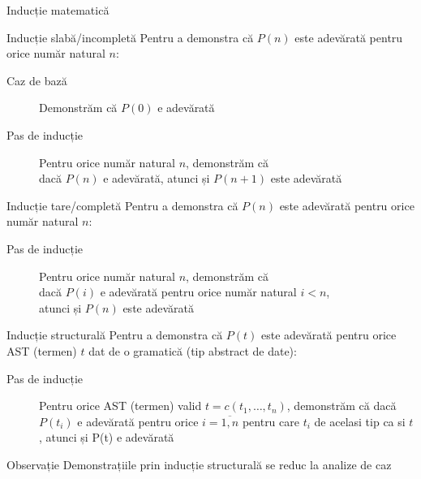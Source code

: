 \begin{section}{Inducție matematică}
\begin{frame}{Inducție slabă/incompletă}
Pentru a demonstra că $P(n)$ este adevărată pentru orice număr natural $n$:
\begin{description}
\item[Caz de bază] Demonstrăm că $P(0)$ e adevărată
\item[Pas de inducție] Pentru orice număr natural $n$, demonstrăm că \\dacă $P(n)$ e adevărată, atunci și $P(n+1)$ este adevărată 
\end{description}
\end{frame}

\begin{frame}{Inducție tare/completă}
Pentru a demonstra că $P(n)$ este adevărată pentru orice număr natural $n$:
\begin{description}
\item[Pas de inducție] Pentru orice număr natural $n$, demonstrăm că \\dacă $P(i)$ e adevărată pentru orice număr natural $i < n$, \\atunci și $P(n)$ este adevărată 
\end{description}
\end{frame}


\begin{frame}{Inducție structurală}
Pentru a demonstra că $P(t)$ este adevărată pentru orice AST (termen) $t$ dat de o gramatică (tip abstract de date):
\begin{description}
\item[Pas de inducție] Pentru orice AST (termen) valid $t = c(t_1,\ldots,t_n)$, demonstrăm că dacă $P(t_i)$ e adevărată pentru orice $i=\overline{1,n}$ pentru care $t_i$ de acelasi tip ca si $t$, atunci și P(t) e adevărată
\end{description}

\begin{block}{Observație}
Demonstrațiile prin inducție structurală se reduc la analize de caz
\end{block}
\end{frame}


\end{section}
